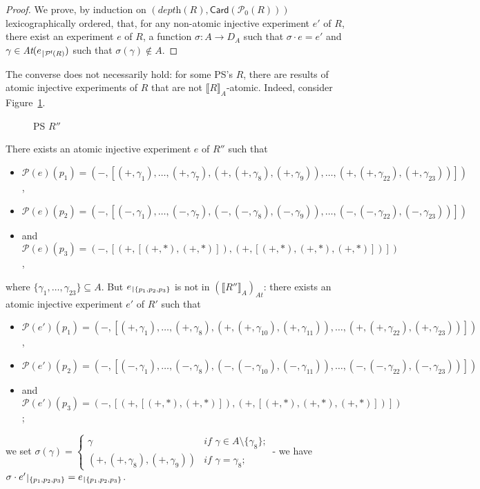 \documentclass{article}
\theoremstyle{plain}
\newcommand{\atoms}[1]{\textit{At}(#1)}
\newcommand{\depthof}[1]{\textit{depth}(#1)}
\def\restriction#1#2{\mathchoice
              {\setbox1\hbox{${\displaystyle #1}_{\scriptstyle #2}$}
              \restrictionaux{#1}{#2}}
              {\setbox1\hbox{${\textstyle #1}_{\scriptstyle #2}$}
              \restrictionaux{#1}{#2}}
              {\setbox1\hbox{${\scriptstyle #1}_{\scriptscriptstyle #2}$}
              \restrictionaux{#1}{#2}}
              {\setbox1\hbox{${\scriptscriptstyle #1}_{\scriptscriptstyle #2}$}
              \restrictionaux{#1}{#2}}}
\def\restrictionaux#1#2{{#1\,\smash{\vrule height .8\ht1 depth .85\dp1}}_{\,#2}}
\newcommand{\portsatzero}[1]{\mathcal{P}_0(#1)}
\newcommand{\ports}[1]{\mathcal{P}(#1)}
\newcommand{\conclusions}[1]{\mathcal{P}^{\textsf{f}}(#1)}
\newcommand{\sm}[1]{\llbracket #1 \rrbracket}
\newcommand{\Card}[1]{\textsf{Card}\left( #1 \right)}
\newcommand{\scalefactfour}{0.7}
\newcommand{\pictfour}[1]{\scalebox{\scalefactfour}{}}
\begin{document}
\begin{proof}
We prove, by induction on $(\depthof{R}, \Card{\portsatzero{R}})$ lexicographically ordered, that, for any non-atomic injective experiment $e'$ of $R$, there exist an experiment $e$ of $R$, a function $\sigma : A \to D_A$ such that $\sigma \cdot e = e'$ and $\gamma \in \atoms{\restriction{e}{\conclusions{R}}}$ such that $\sigma(\gamma) \notin A$.
\end{proof}

The converse does not necessarily hold: for some PS's $R$, there are results of atomic injective experiments of $R$ that are not $\sm{R}_A$-atomic. Indeed, consider Figure~\ref{fig: atomic experiments}. 
\begin{figure}[!t]
\centering
\pictfour{atomic}
\caption{PS $R''$}
\label{fig: atomic experiments}
\end{figure}
There exists an atomic injective experiment $e$ of $R''$ such that 
\begin{itemize}
\item $\ports{e}(p_1) = (-, [(+, \gamma_1), \ldots, (+, \gamma_7), (+, (+, \gamma_{8}), (+, \gamma_{9})), \ldots, (+, (+, \gamma_{22}), (+, \gamma_{23}))])$, 
\item $\ports{e}(p_2) = (-, [(-, \gamma_1), \ldots, (-, \gamma_7), (-, (-, \gamma_{8}), (-, \gamma_{9})), \ldots, (-, (-, \gamma_{22}), (-, \gamma_{23}))])$
\item and $\ports{e}(p_3) = (-, [(+, [(+, \ast), (+, \ast)]), (+, [(+, \ast), (+, \ast), (+, \ast)]) ])$,
\end{itemize}
where $\{ \gamma_1, \ldots, \gamma_{23} \} \subseteq A$. But $\restriction{e}{\{ p_1, p_2, p_3 \}}$ is not in ${(\sm{R''}_A)}_{\textit{At}}$: there exists an atomic injective experiment $e'$ of $R'$ such that 
\begin{itemize}
\item $\ports{e'}(p_1) = (-, [(+, \gamma_1), \ldots, (+, \gamma_8), (+, (+, \gamma_{10}), (+, \gamma_{11})), \ldots, (+, (+, \gamma_{22}), (+, \gamma_{23}))])$, 
\item $\ports{e'}(p_2) = (-, [(-, \gamma_1), \ldots, (-, \gamma_8), (-, (-, \gamma_{10}), (-, \gamma_{11})), \ldots, (-, (-, \gamma_{22}), (-, \gamma_{23}))])$ 
\item and $\ports{e'}(p_3) = (-, [(+, [(+, \ast), (+, \ast)]), (+, [(+, \ast), (+, \ast), (+, \ast)]) ])$;
\end{itemize}
we set $\sigma(\gamma) = \left\lbrace \begin{array}{ll} \gamma & \textit{if $\gamma \in A \setminus \{ \gamma_8 \}$;}\\ (+, (+, \gamma_8), (+, \gamma_9)) & \textit{if $\gamma = \gamma_8$;} \end{array} \right.$ - we have $\sigma \cdot \restriction{e'}{\{ p_1, p_2, p_3 \}} = \restriction{e}{\{ p_1, p_2, p_3 \}}$.
\end{document}
